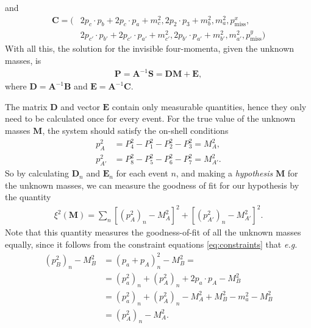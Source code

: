 \documentclass[twoside,english]{uiofysmaster}
\begin{document}
and
\begin{align}
	\mathbf{C} = ( &2p_c \cdot p_b + 2p_c \cdot p_a + m_c^2, 2 p_2 \cdot p_3 + m_b^2, m_a^2, p_\mathrm{miss}^x, \nonumber \\ 
				   &2p_{c'}\cdot p_{b'} + 2 p_{c'} \cdot p_{a'} + m_{c'}^2, 2 p_{b'} \cdot p_{a'} + m_{b'}^2, m_{a'}^2, p_\mathrm{miss}^y )
\end{align}
With all this, the solution for the invisible four-momenta, given the unknown masses, is 
\begin{align}
	\mathbf{P} = \mathbf{A}^{-1} \mathbf{S} = \mathbf{D} \mathbf{M} + \mathbf{E},
\end{align}
where $\mathbf{D} = \mathbf{A}^{-1}\mathbf{B}$ and $\mathbf{E} = \mathbf{A}^{-1}\mathbf{C}$.

The matrix $\mathbf{D}$ and vector $\mathbf{E}$ contain only measurable quantities, hence they only need to be calculated once for every event. For the true value of the unknown masses $\mathbf{M}$, the system should satisfy the on-shell conditions
\begin{align}
	p_{A}^2 &= P_4^2 - P_1 ^2 - P_2^2 - P_3^2 = M_{A}^2, \nonumber\\
	p_{A'}^2 &= P_8^2 - P_5 ^2 - P_6^2 - P_7^2 = M_{A'}^2.
\end{align}
So by calculating $\mathbf{D}_n$ and $\mathbf{E}_n$ for each event $n$, and making a {\it hypothesis} $\mathbf{M}$ for the unknown masses, we can measure the goodness of fit for our hypothesis by the quantity
\begin{align}
	\xi^2(\mathbf{M}) = \sum_n \left[(p_{A}^2)_n - M_A^2\right]^2 + \left[(p_{A'}^2)_n - M_{A'}^2\right]^2. \label{eq:xisquared}
\end{align}
Note that this quantity measures the goodness-of-fit of all the unknown masses equally, since it follows from the constraint equations \eqref{eq:constraints} that {\it e.g.}
\begin{align}
	(p_B^2)_n - M_B^2 &= (p_a + p_A)_n^2 - M_B^2 = \nonumber\\
				  &= (p_a^2)_n + (p_A^2)_n + 2p_a\cdot p_A - M_B^2\nonumber\\
				  &= (p_a^2)_n + (p_A^2)_n - M_A^2 + M_B^2 - m_a^2 - M_B^2\\
				  &= (p_A^2)_n - M_A^2.\nonumber
\end{align}
\end{document}
